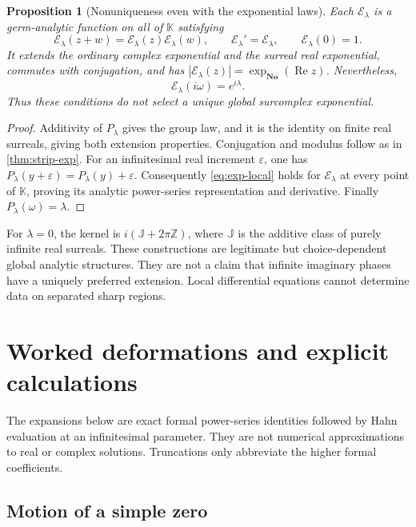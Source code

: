 \documentclass[11pt,a4paper]{article}
\numberwithin{equation}{section}
\newtheorem{proposition}[theorem]{Proposition}
\theoremstyle{definition}
\newcommand{\No}{\mathbf{No}}
\newcommand{\K}{\mathbb K}
\newcommand{\Z}{\mathbb Z}
\DeclareMathOperator{\Ree}{Re}
\begin{document}
\begin{proposition}[Nonuniqueness even with the exponential laws]
\label{prop:manyexp}
Each $\mathcal E_\lambda$ is a germ-analytic function on all of $\K$ satisfying
\[
 \mathcal E_\lambda(z+w)=\mathcal E_\lambda(z)\mathcal E_\lambda(w),\qquad
 \mathcal E_\lambda'=\mathcal E_\lambda,\qquad
 \mathcal E_\lambda(0)=1.
\]
It extends the ordinary complex exponential and the surreal real exponential,
commutes with conjugation, and has
$|\mathcal E_\lambda(z)|=\exp_{\No}(\Ree z)$.
Nevertheless,
\[
 \mathcal E_\lambda(i\omega)=e^{i\lambda}.
\]
Thus these conditions do not select a unique global surcomplex exponential.
\end{proposition}
\begin{proof}
Additivity of $P_\lambda$ gives the group law, and it is the identity on finite
real surreals, giving both extension properties. Conjugation and modulus
follow as in \cref{thm:strip-exp}. For an infinitesimal real increment
$\varepsilon$, one has $P_\lambda(y+\varepsilon)=P_\lambda(y)+\varepsilon$.
Consequently \eqref{eq:exp-local} holds for $\mathcal E_\lambda$ at every point
of $\K$, proving its analytic power-series representation and derivative.
Finally $P_\lambda(\omega)=\lambda$.
\end{proof}

For $\lambda=0$, the kernel is
$i(\mathbb J+2\pi\Z)$, where $\mathbb J$ is the additive class of purely
infinite real surreals. These constructions are legitimate but choice-dependent
global analytic structures. They are not a claim that infinite imaginary
phases have a uniquely preferred extension. Local differential equations
cannot determine data on separated sharp regions.

\section{Worked deformations and explicit calculations}

The expansions below are exact formal power-series identities followed by
Hahn evaluation at an infinitesimal parameter. They are not numerical
approximations to real or complex solutions. Truncations only abbreviate the
higher formal coefficients.

\subsection{Motion of a simple zero}
\end{document}
